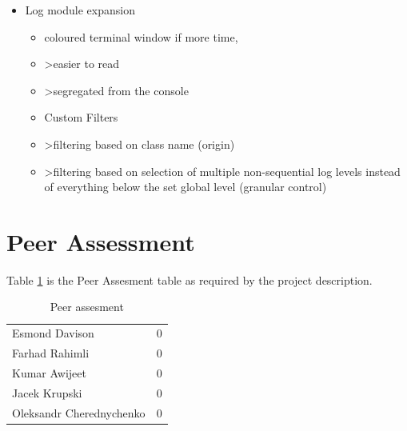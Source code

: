 \begin{itemize}
    \item Log module expansion
    \begin{itemize}
        \item coloured terminal window if more time,
        \item >easier to read
        \item >segregated from the console
        \item Custom Filters
        \item >filtering based on class name (origin)
        \item >filtering based on selection of multiple non-sequential log levels instead of everything below the set global level (granular control)
    \end{itemize}
\end{itemize}

\section{Peer Assessment}
Table \ref{table:peerAssesment} is the Peer Assesment table as required by the project description.

\begin{table}[hb]
\centering
\caption{Peer assesment}
\label{table:peerAssesment}
\begin{tabular}{lc}
\hline
Esmond Davison &  0 \\
Farhad Rahimli & 0 \\
Kumar Awijeet &  0\\
Jacek Krupski &  0 \\
Oleksandr Cherednychenko &  0 \\
\hline
\end{tabular}
\end{table}

\setlength{\parskip}{0em}
